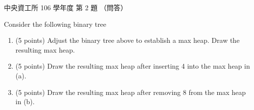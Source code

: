 \begin{pastexam}[label={px:ncu-106-dsa-02}]{中央資工所 106 學年度 第 2 題}
（問答）

Consider the following binary tree
\begin{center}
\end{center}
\begin{enumerate}[label=(\alph*)]
\item (5 points) Adjust the binary tree above to establish a max heap. Draw the resulting max heap.
\item (5 points) Draw the resulting max heap after inserting 4 into the max heap in (a).
\item (5 points) Draw the resulting max heap after removing 8 from the max heap in (b).
\end{enumerate}
\end{pastexam}

